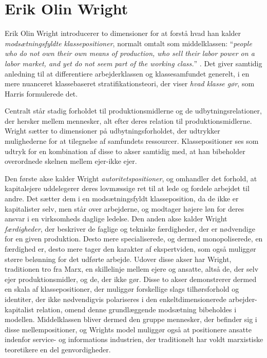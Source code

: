 \section{Erik Olin Wright \label{2_wright}}

Erik Olin Wright introducerer to dimensioner for at forstå hvad han kalder \emph{modsætningsfyldte klassepositioner}, normalt omtalt som middelklassen: “\emph{people who do not own their own means of production, who sell their labor power on a labor market, and yet do not seem part of the working class.}” \parencite[15]{Wright2000}. Det giver samtidig anledning til at differentiere arbejderklassen og klassesamfundet generelt, i en mere nuanceret klassebaseret stratifikationsteori, der viser \emph{hvad klasse gør}, som Harris formulerede det. 

Centralt står stadig forholdet til produktionsmidlerne og de udbytningsrelationer, der hersker mellem mennesker, alt efter deres relation til produktionsmidlerne. Wright sætter to dimensioner på udbytningsforholdet, der udtrykker mulighederne for at tilegnelse af samfundets ressourcer. Klassepositioner ses som udtryk for en kombination af disse to akser samtidig med, at han bibeholder overordnede skelnen mellem ejer-ikke ejer.

Den første akse kalder Wright \emph{autoritetspositioner}, og omhandler det forhold, at kapitalejere uddelegerer deres lovmæssige ret til at lede og fordele arbejdet til andre. Det sætter dem i en modsætningsfyldt klasseposition, da de ikke er kapitalister selv, men står over arbejderne, og modtager højere løn for deres ansvar i en virksomheds daglige ledelse. Den anden akse kalder Wright \emph{færdigheder}, der beskriver de faglige og tekniske færdigheder, der er nødvendige for en given produktion. Desto mere specialiserede, og dermed monopoliserede, en færdighed er, desto mere tager den karakter af ekspertviden, som også muliggør større belønning for det udførte arbejde. %
Udover disse akser har Wright, traditionen tro fra Marx, en skillelinje mellem ejere og ansatte, altså de, der selv ejer produktionsmidler, og de, der ikke gør. Disse to akser demonstrerer dermed en skala af klassepositioner, der muliggør forskellige slags tilhørsforhold og identiter, der ikke nødvendigvis polariseres i den enkeltdimensionerede arbejder-kapitalist relation, omend denne grundlæggende modsætning bibeholdes i modellen. Middelklassen bliver dermed den gruppe mennesker, der befinder sig i disse mellempositioner, og Wrights model muliggør også at positionere ansatte indenfor service- og informations industrien, der traditionelt har voldt marxistiske teoretikere en del genvordigheder.

